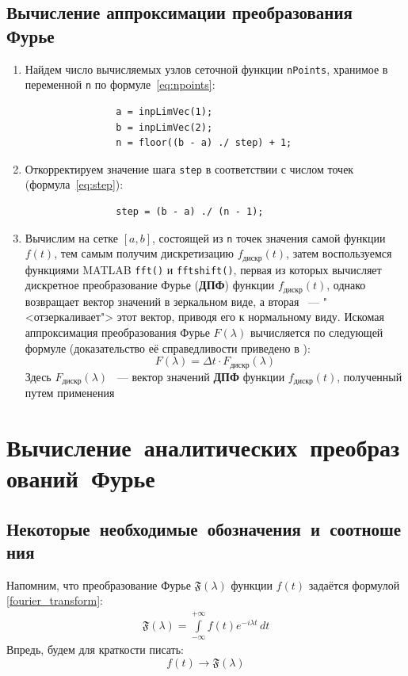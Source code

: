 \documentclass[11pt, oneside, draft]{article}
\numberwithin{equation}{section}
\newcommand \four[1][\lambda]{\mathfrak{F}(#1)}
\newcommand \rarrow{\rightarrow}
\newcommand \intinf[1][{\,dt}]{ \int\limits_{-\infty}^{+\infty}{{#1}}}
\begin{document}
    \subsection{Вычисление аппроксимации преобразования Фурье} %
    \label{sub:fft}
    \begin{enumerate}
        \item Найдем число вычисляемых узлов сеточной функции \texttt{nPoints}, хранимое в переменной \texttt{n} по формуле~\eqref{eq:npoints}:
            \begin{verbatim}
                a = inpLimVec(1);
                b = inpLimVec(2);
                n = floor((b - a) ./ step) + 1;
            \end{verbatim}
            
        \item Откорректируем значение шага \texttt{step} в соответствии с числом точек (формула~\eqref{eq:step}):
            \begin{verbatim}
                step = (b - a) ./ (n - 1);
            \end{verbatim}
        \item Вычислим на сетке \([a, b]\), состоящей из \texttt{n} точек значения самой функции \(f(t)\), тем самым получим дискретизацию \(f_\text{дискр}(t)\), затем воспользуемся функциями MATLAB \texttt{fft()} и \texttt{fftshift()}, первая из которых вычисляет дискретное преобразование Фурье (\textbf{ДПФ}) функции \(f_\text{дискр}(t)\), однако возвращает
        вектор значений в зеркальном виде, а вторая ~--- "<отзеркаливает"> этот вектор, приводя его к нормальному виду. 
        Искомая аппроксимация преобразования Фурье \(F(\lambda)\) вычисляется по следующей формуле (доказательство её справедливости приведено в \cite{Roublev:fourier}):
        \[
            F(\lambda) = \Delta t \cdot F_\text{дискр}(\lambda)
        \]
        Здесь \( F_\text{дискр}(\lambda) \) ~--- вектор значений \textbf{ДПФ} функции \(f_\text{дискр}(t)\), полученный путем применения 
    \end{enumerate}
    \pagebreak
    \section{Вычисление~аналитических~преобразований~Фурье}

    \subsection{Некоторые~необходимые~обозначения~и~соотношения}
    Напомним, что преобразование Фурье \( \four \) функции \(f(t)\) задаётся формулой \eqref{fourier_transform}: 
    \begin{align*}
        \four = \intinf[ {f(t) e^{-i\lambda t}\, dt}] 
    \end{align*}
    Впредь, будем для краткости писать:
    \[ \boxed{ f(t)\rarrow\four} \]
\end{document}
